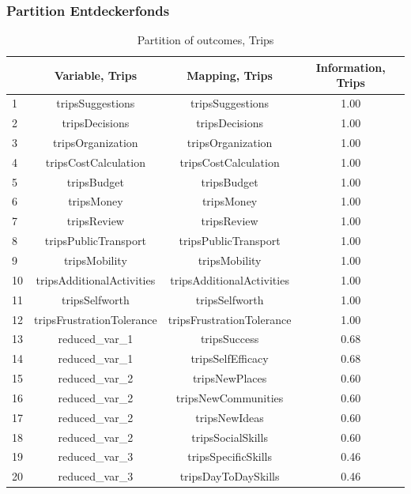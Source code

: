\begin{frame}
\frametitle{Partition Entdeckerfonds}
\begin{table}[ht]
\centering
\begin{tabular}{lccc}
  \hline
 & Variable, Trips & Mapping, Trips & Information, Trips \\ 
  \hline
1 & tripsSuggestions & tripsSuggestions & 1.00 \\ 
  2 & tripsDecisions & tripsDecisions & 1.00 \\ 
  3 & tripsOrganization & tripsOrganization & 1.00 \\ 
  4 & tripsCostCalculation & tripsCostCalculation & 1.00 \\ 
  5 & tripsBudget & tripsBudget & 1.00 \\ 
  6 & tripsMoney & tripsMoney & 1.00 \\ 
  7 & tripsReview & tripsReview & 1.00 \\ 
  8 & tripsPublicTransport & tripsPublicTransport & 1.00 \\ 
  9 & tripsMobility & tripsMobility & 1.00 \\ 
  10 & tripsAdditionalActivities & tripsAdditionalActivities & 1.00 \\ 
  11 & tripsSelfworth & tripsSelfworth & 1.00 \\ 
  12 & tripsFrustrationTolerance & tripsFrustrationTolerance & 1.00 \\ 
  13 & reduced\_var\_1 & tripsSuccess & 0.68 \\ 
  14 & reduced\_var\_1 & tripsSelfEfficacy & 0.68 \\ 
  15 & reduced\_var\_2 & tripsNewPlaces & 0.60 \\ 
  16 & reduced\_var\_2 & tripsNewCommunities & 0.60 \\ 
  17 & reduced\_var\_2 & tripsNewIdeas & 0.60 \\ 
  18 & reduced\_var\_2 & tripsSocialSkills & 0.60 \\ 
  19 & reduced\_var\_3 & tripsSpecificSkills & 0.46 \\ 
  20 & reduced\_var\_3 & tripsDayToDaySkills & 0.46 \\ 
   \hline
\end{tabular}
\caption{Partition of outcomes, Trips} 
\label{partitiontrips}
\end{table}

\end{frame}


